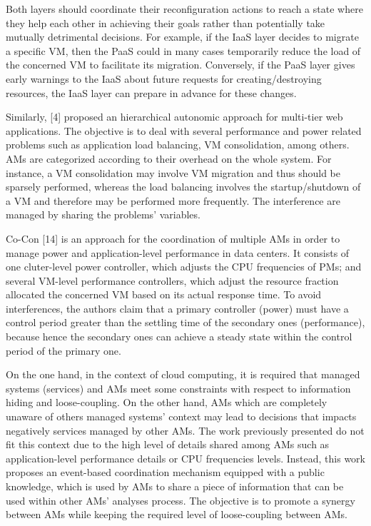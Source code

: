 Both layers should coordinate their reconfiguration actions to reach a state where they help each other in achieving their goals rather than potentially take mutually detrimental decisions. For example, if the IaaS layer decides to migrate a specific VM, then the PaaS could in many cases temporarily reduce the load of the concerned VM to facilitate its migration. Conversely, if the PaaS layer gives early warnings to the IaaS about future
requests for creating/destroying resources, the IaaS layer can prepare in advance for these changes. 


Similarly, [4] proposed an hierarchical autonomic approach
for multi-tier web applications. The objective is to deal with
several performance and power related problems such as
application load balancing, VM consolidation, among others.
AMs are categorized according to their overhead on the whole
system. For instance, a VM consolidation may involve VM
migration and thus should be sparsely performed, whereas the
load balancing involves the startup/shutdown of a VM and
therefore may be performed more frequently. The interference are managed by sharing the problems’ variables.

Co-Con [14] is an approach for the coordination of multiple AMs in order to manage power and application-level performance in data centers. It consists of one cluter-level power controller, which adjusts the CPU frequencies of PMs; and several VM-level performance controllers, which adjust the resource fraction allocated the concerned VM based on its actual response time. To avoid interferences, the authors claim that a primary controller (power) must have a control period greater than the settling time of the secondary ones (performance), because hence the secondary ones can achieve a steady state within the control period of the primary one.

On the one hand, in the context of cloud computing, it is required that managed systems (services) and AMs meet some constraints with respect to information hiding and loose-coupling. On the other hand, AMs which are completely unaware of others managed systems’ context may lead to decisions that impacts negatively services managed by other AMs. The work previously presented do not fit this context due to the high level of details shared among AMs such as application-level performance details or CPU frequencies levels. Instead, this work proposes an event-based coordination mechanism equipped with a public knowledge, which is used by AMs to share a piece of information that can be used within other AMs’ analyses process. The objective is to promote a synergy between AMs while keeping the required level of loose-coupling between AMs.